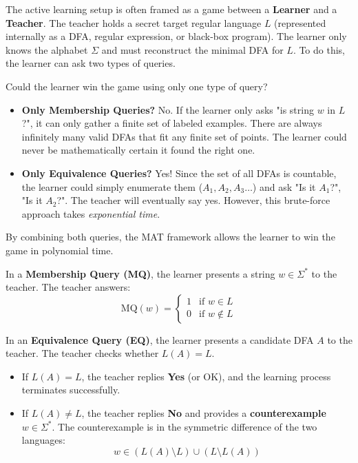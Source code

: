 The active learning setup is often framed as a game between a \textbf{Learner} and a \textbf{Teacher}. The teacher holds a secret target regular language $L$ (represented internally as a DFA, regular expression, or black-box program). The learner only knows the alphabet $\Sigma$ and must reconstruct the minimal DFA for $L$. To do this, the learner can ask two types of queries. 

Could the learner win the game using only one type of query?
\begin{itemize}
    \item \textbf{Only Membership Queries?} No. If the learner only asks "is string $w$ in $L$?", it can only gather a finite set of labeled examples. There are always infinitely many valid DFAs that fit any finite set of points. The learner could never be mathematically certain it found the right one.
    \item \textbf{Only Equivalence Queries?} Yes! Since the set of all DFAs is countable, the learner could simply enumerate them ($A_1, A_2, A_3 \dots$) and ask "Is it $A_1$?", "Is it $A_2$?". The teacher will eventually say yes. However, this brute-force approach takes \emph{exponential time}.
\end{itemize}

By combining both queries, the MAT framework allows the learner to win the game in polynomial time.

\begin{definition}
\label{def:membership-query}
In a \textbf{Membership Query (MQ)}, the learner presents a string $w \in \Sigma^*$ to the teacher. The teacher answers:
\[
  \text{MQ}(w) = 
  \begin{cases} 
    1 & \text{if } w \in L \\
    0 & \text{if } w \notin L
  \end{cases}
\]
\end{definition}

\begin{definition}
\label{def:equivalence-query}
In an \textbf{Equivalence Query (EQ)}, the learner presents a candidate DFA $A$ to the teacher. The teacher checks whether $L(A) = L$.
\begin{itemize}
  \item If $L(A) = L$, the teacher replies \textbf{Yes} (or OK), and the learning process terminates successfully.
  \item If $L(A) \neq L$, the teacher replies \textbf{No} and provides a \textbf{counterexample} $w \in \Sigma^*$. The counterexample is in the symmetric difference of the two languages:
  \[
    w \in (L(A) \setminus L) \cup (L \setminus L(A))
  \]
\end{itemize}
\end{definition}


